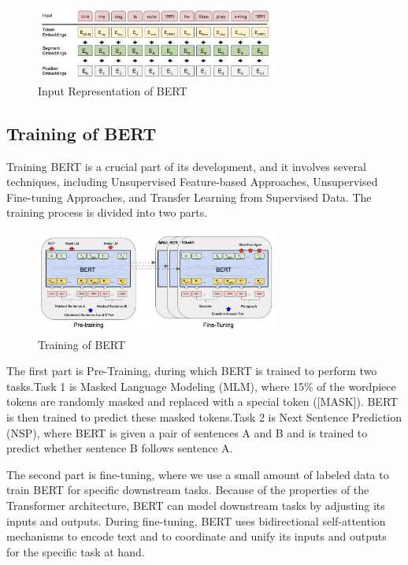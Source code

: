 \documentclass{IEEEtran}
\begin{document}
\begin{figure}[htbp]
    \centerline{\includegraphics[width = 8cm]{pic/fig3.png}}
    \caption{Input Representation of BERT}
    \label{fig}
\end{figure}


\subsection{Training of BERT}

\par Training BERT is a crucial part of its development, and it involves several 
techniques, including Unsupervised Feature-based Approaches, Unsupervised 
Fine-tuning Approaches, and Transfer Learning from Supervised Data. The training 
process is divided into two parts. 

\begin{figure}[htbp]
    \centerline{\includegraphics[width = 8cm]{pic/fig4.png}}
    \caption{Training of BERT}
    \label{fig}
\end{figure}

\par The first part is Pre-Training, during which BERT 
is trained to perform two tasks.Task 1 is Masked Language Modeling (MLM), where 
15\% of the wordpiece tokens are randomly masked and replaced with a special token ([MASK]). 
BERT is then trained to predict these masked tokens.Task 2 is Next Sentence Prediction (NSP), 
where BERT is given a pair of sentences A and B and is trained to predict whether 
sentence B follows sentence A.

\par The second part is fine-tuning, where we use a small amount of 
labeled data to train BERT for specific downstream tasks. Because of the properties of 
the Transformer architecture, BERT can model downstream tasks by adjusting its inputs and 
outputs. During fine-tuning, BERT uses bidirectional self-attention mechanisms to encode 
text and to coordinate and unify its inputs and outputs for the specific task at hand.
\end{document}
